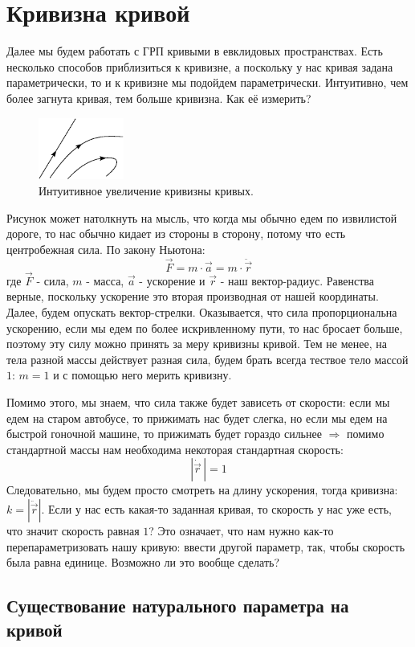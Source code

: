\documentclass[12pt]{article}
\theoremstyle{definition}
\begin{document}
\section*{Кривизна кривой}
Далее мы будем работать с ГРП кривыми в евклидовых пространствах. Есть несколько способов приблизиться к кривизне, а поскольку у нас кривая задана параметрически, то и к кривизне мы подойдем параметрически. Интуитивно, чем более загнута кривая, тем больше кривизна. Как её измерить?
\begin{figure}[H]
	\centering
	\includegraphics[width=0.25\textwidth]{CDGL1_8.eps}
	\caption{Интуитивное увеличение кривизны кривых.}
	\label{1_8}
\end{figure}
Рисунок может натолкнуть на мысль, что когда мы обычно едем по извилистой дороге, то нас обычно кидает из стороны в сторону, потому что есть центробежная сила. По закону Ньютона:
$$
	\vec{F} = m{\cdot}\vec{a} = m{\cdot}\ddot{\vec{r}}
$$
где $\vec{F}$ - сила, $m$ - масса, $\vec{a}$ - ускорение и $\vec{r}$ - наш вектор-радиус. Равенства верные, поскольку ускорение это вторая производная от нашей координаты. Далее, будем опускать вектор-стрелки. Оказывается, что сила пропорциональна ускорению, если мы едем по более искривленному пути, то нас бросает больше, поэтому эту силу можно принять за меру кривизны кривой. Тем не менее, на тела разной массы действует разная сила, будем брать всегда тествое тело массой $1$: $m = 1$ и с помощью него мерить кривизну. 

Помимо этого, мы знаем, что сила также будет зависеть от скорости: если мы едем на старом автобусе, то прижимать нас будет слегка, но если мы едем на быстрой гоночной машине, то прижимать будет гораздо сильнее $\Rightarrow$ помимо стандартной массы нам необходима некоторая стандартная скорость:
$$
	|\dot{\vec{r}} \, | = 1
$$
Следовательно, мы будем просто смотреть на длину ускорения, тогда кривизна: $k = |\ddot{\vec{r}}|$. Если у нас есть какая-то заданная кривая, то скорость у нас уже есть, что значит скорость равная $1$? Это означает, что нам нужно как-то перепараметризовать нашу кривую: ввести другой параметр, так, чтобы скорость была равна единице. Возможно ли это вообще сделать?

\subsection*{Существование натурального параметра на кривой}
\end{document}

